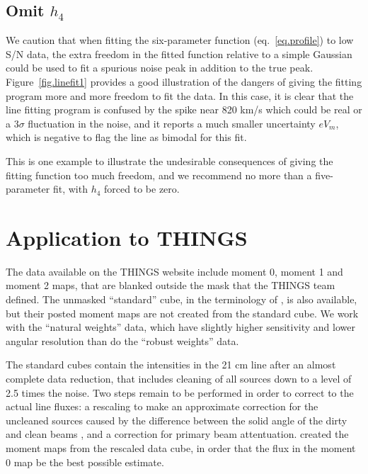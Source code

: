 \documentclass[letterpaper,fleqn,usenatbib]{mnras}
\begin{document}
\subsection{Omit $h_4$}
We caution that when fitting the six-parameter function
(eq.~\ref{eq.profile}) to low S/N data, the extra freedom in the
fitted function relative to a simple Gaussian could be used to fit a
spurious noise peak in addition to the true peak.
Figure~\ref{fig.linefit1} provides a good illustration of the dangers
of giving the fitting program more and more freedom to fit the data.
In this case, it is clear that the line fitting program is confused by
the spike near 820 km/s which could be real or a $3\sigma$ fluctuation
in the noise, and it reports a much smaller uncertainty $eV_m$, which
is negative to flag the line as bimodal for this fit.

This is one example to illustrate the undesirable consequences of
giving the fitting function too much freedom, and we recommend no more
than a five-parameter fit, with $h_4$ forced to be zero.

\section{Application to THINGS}
\label{sec.THINGS}
The data available on the THINGS website include moment 0, moment 1
and moment 2 maps, that are blanked outside the mask that the THINGS
team defined.  The unmasked ``standard'' cube, in the terminology of
\citet{Wa08}, is also available, but their posted moment maps are not
created from the standard cube.  We work with the ``natural weights''
data, which have slightly higher sensitivity and lower angular
resolution than do the ``robust weights'' data.

The standard cubes contain the intensities in the 21 cm line after an
almost complete data reduction, that includes cleaning of all sources
down to a level of 2.5 times the noise.  Two steps remain to be
performed in order to correct to the actual line fluxes: a rescaling
to make an approximate correction for the uncleaned sources caused by
the difference between the solid angle of the dirty and clean beams
\citep{JvM}, and a correction for primary beam attentuation.
\citet{Wa08} created the moment maps from the rescaled data cube, in
order that the flux in the moment 0 map be the best possible estimate.
\end{document}
